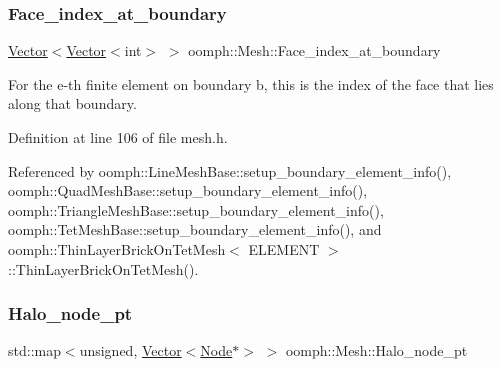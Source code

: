 \mbox{\label{classoomph_1_1Mesh_a62adbe45fe65ff9cd329bb45d197347c}} 
\subsubsection{\texorpdfstring{Face\+\_\+index\+\_\+at\+\_\+boundary}{Face\_index\_at\_boundary}}
{\footnotesize\ttfamily \hyperlink{classoomph_1_1Vector}{Vector}$<$\hyperlink{classoomph_1_1Vector}{Vector}$<$int$>$ $>$ oomph\+::\+Mesh\+::\+Face\+\_\+index\+\_\+at\+\_\+boundary\hspace{0.3cm}{\ttfamily [protected]}}



For the e-\/th finite element on boundary b, this is the index of the face that lies along that boundary. 



Definition at line 106 of file mesh.\+h.



Referenced by oomph\+::\+Line\+Mesh\+Base\+::setup\+\_\+boundary\+\_\+element\+\_\+info(), oomph\+::\+Quad\+Mesh\+Base\+::setup\+\_\+boundary\+\_\+element\+\_\+info(), oomph\+::\+Triangle\+Mesh\+Base\+::setup\+\_\+boundary\+\_\+element\+\_\+info(), oomph\+::\+Tet\+Mesh\+Base\+::setup\+\_\+boundary\+\_\+element\+\_\+info(), and oomph\+::\+Thin\+Layer\+Brick\+On\+Tet\+Mesh$<$ E\+L\+E\+M\+E\+N\+T $>$\+::\+Thin\+Layer\+Brick\+On\+Tet\+Mesh().

\mbox{\label{classoomph_1_1Mesh_aa36c21b9e32a318c4b043aea2411cdac}} 
\subsubsection{\texorpdfstring{Halo\+\_\+node\+\_\+pt}{Halo\_node\_pt}}
{\footnotesize\ttfamily std\+::map$<$unsigned, \hyperlink{classoomph_1_1Vector}{Vector}$<$\hyperlink{classoomph_1_1Node}{Node}$\ast$$>$ $>$ oomph\+::\+Mesh\+::\+Halo\+\_\+node\+\_\+pt\hspace{0.3cm}{\ttfamily [protected]}}



